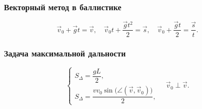\documentclass[12pt, a4paper]{article}
\begin{document}
\subsubsection*{Векторный метод в баллистике}

\[
\vec v_0 + \vec g t = \vec v,
\quad
\vec v_0 t + \frac{\vec g t^2}{2} = \vec s,
\quad
\vec v_0 + \frac{\vec g t}{2} = \frac{\vec s}{t}.
\]

\subsubsection*{Задача максимальной дальности}

\[
\begin{cases}
S_\Delta = \dfrac{gL}{2}, \\
S_\Delta = \dfrac{v v_0 \sin\bigl(\angle(\vec v, \vec v_0)\bigr)}{2},
\end{cases}
\quad
\vec v_0 \perp \vec v.
\]
\end{document}
